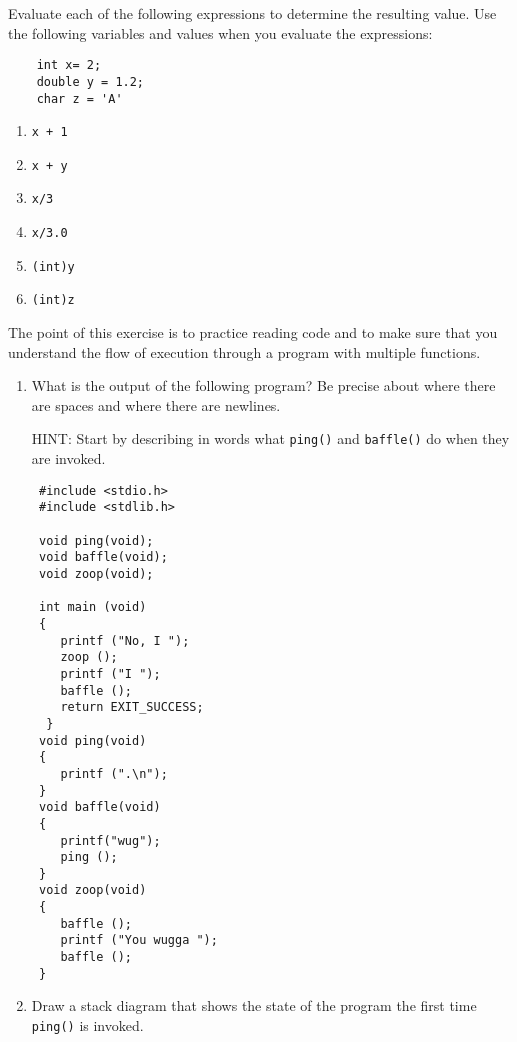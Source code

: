 

\begin{exercise}
	
Evaluate each of the following expressions to determine the resulting value. 
Use the following variables and values when you evaluate the expressions:
\begin{verbatim}
	int x= 2;
	double y = 1.2;
	char z = 'A'
\end{verbatim}
%
\begin{enumerate}
	\item {\tt x + 1}
	\item {\tt x + y}
	\item {\tt x/3}
	\item {\tt x/3.0}
	\item {\tt (int)y}
	\item {\tt (int)z}
\end{enumerate}
\end{exercise}

\begin{exercise}

The point of this exercise is to practice reading code and to
make sure that you understand the flow of execution through
a program with multiple functions.

\begin{enumerate}

\item What is the output of the following program?  Be precise
about where there are spaces and where there are newlines.

HINT: Start by describing in words what {\tt ping()} and
{\tt baffle()} do when they are invoked.

\begin{verbatim}
 #include <stdio.h>
 #include <stdlib.h>

 void ping(void);
 void baffle(void);
 void zoop(void);

 int main (void)
 {
 	printf ("No, I ");
 	zoop ();
 	printf ("I ");
 	baffle ();
 	return EXIT_SUCCESS;
  }
 void ping(void)
 {
 	printf (".\n"); 
 }
 void baffle(void)
 {
 	printf("wug");
 	ping (); 
 }
 void zoop(void)
 {
 	baffle ();
 	printf ("You wugga ");
 	baffle ();
 }
\end{verbatim}
%

\item Draw a stack diagram that shows the state of the program
the first time {\tt ping()} is invoked.

\end{enumerate}

\end{exercise}

